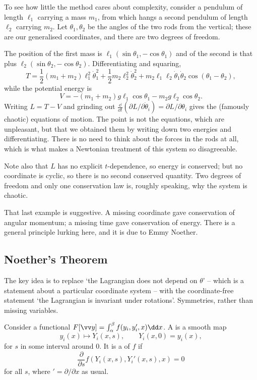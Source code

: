 \begin{example}
	To see how little the method cares about complexity, consider a pendulum of length $\ell_1$ carrying a mass $m_1$, from which hangs a second pendulum of length $\ell_2$ carrying $m_2$. Let $\theta_1, \theta_2$ be the angles of the two rods from the vertical; these are our generalised coordinates, and there are two degrees of freedom.

	The position of the first mass is $\ell_1(\sin\theta_1, -\cos\theta_1)$ and of the second is that plus $\ell_2(\sin\theta_2, -\cos\theta_2)$. Differentiating and squaring,
	$$
	T = \frac{1}{2}(m_1 + m_2)\ell_1^2\dot\theta_1^2 + \frac{1}{2}m_2\ell_2^2\dot\theta_2^2 + m_2\ell_1\ell_2 \dot\theta_1\dot\theta_2\cos(\theta_1 - \theta_2),
	$$
	while the potential energy is
	$$
	V = -(m_1 + m_2)g\ell_1\cos\theta_1 - m_2 g \ell_2\cos\theta_2.
	$$
	Writing $L = T - V$ and grinding out $\frac{\dd}{\dd t}(\partial L/\partial \dot\theta_i) = \partial L/\partial\theta_i$ gives the (famously chaotic) equations of motion. The point is not the equations, which are unpleasant, but that we obtained them by writing down two energies and differentiating. There is no need to think about the forces in the rods at all, which is what makes a Newtonian treatment of this system so disagreeable.

	Note also that $L$ has no explicit $t$-dependence, so energy is conserved; but no coordinate is cyclic, so there is no second conserved quantity. Two degrees of freedom and only one conservation law is, roughly speaking, why the system is chaotic.
\end{example}

That last example is suggestive. A missing coordinate gave conservation of angular momentum; a missing time gave conservation of energy. There is a general principle lurking here, and it is due to Emmy Noether.

\subsection{Noether's Theorem}\label{sec:noether}

The key idea is to replace `the Lagrangian does not depend on $\theta$' -- which is a statement about a particular coordinate system -- with the coordinate-free statement `the Lagrangian is invariant under rotations'. Symmetries, rather than missing variables.

\begin{definition}
	Consider a functional $F[\vv y] = \int_\alpha^\beta f(y_i, y_i', x)\dd x$. A  is a smooth map
	$$
	y_i(x) \longmapsto Y_i(x, s), \qquad Y_i(x, 0) = y_i(x),
	$$
	for $s$ in some interval around $0$. It is a  of $f$ if
	$$
	\frac{\partial}{\partial s}f\left(Y_i(x, s), Y_i'(x, s), x\right) = 0
	$$
	for all $s$, where $' = \partial/\partial x$ as usual.
\end{definition}

